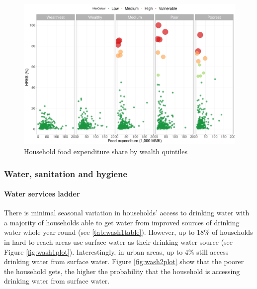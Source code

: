 \documentclass[12pt,a4paper]{article}
\let\oldparagraph\paragraph
\renewcommand{\paragraph}[1]{\oldparagraph{#1}\mbox{}}
\begin{document}
\begin{figure}[H]

{\centering \includegraphics{kayinReport_files/figure-latex/hfesScatterPlot2-1} 

}

\caption{Household food expenditure share by wealth quintiles}\label{fig:hfesScatterPlot2}
\end{figure}

\hypertarget{wash-results}{%
\subsubsection{Water, sanitation and hygiene}\label{wash-results}}

\hypertarget{water-results}{%
\paragraph{Water services ladder}\label{water-results}}

There is minimal seasonal variation in households' access to drinking water with a majority of households able to get water from improved sources of drinking water whole year round (see \ref{tab:wash1table}). However, up to 18\% of households in hard-to-reach areas use surface water as their drinking water source (see Figure \ref{fig:wash1plot}). Interestingly, in urban areas, up to 4\% still access drinking water from surface water. Figure \ref{fig:wash2plot} show that the poorer the household gets, the higher the probability that the household is accessing drinking water from surface water.
\end{document}
